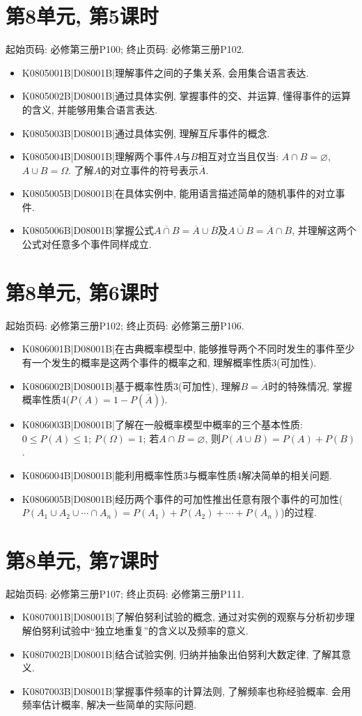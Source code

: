\section*{第8单元, 第5课时}
起始页码: 必修第三册P100; 终止页码: 必修第三册P102.
\begin{itemize}
\item K0805001B|D08001B|理解事件之间的子集关系, 会用集合语言表达.
\item K0805002B|D08001B|通过具体实例, 掌握事件的交、并运算, 懂得事件的运算的含义, 并能够用集合语言表达.
\item K0805003B|D08001B|通过具体实例, 理解互斥事件的概念.
\item K0805004B|D08001B|理解两个事件$A$与$B$相互对立当且仅当: $A\cap B=\varnothing$, $A\cup B=\Omega$. 了解$A$的对立事件的符号表示$\overline A$.
\item K0805005B|D08001B|在具体实例中, 能用语言描述简单的随机事件的对立事件.
\item K0805006B|D08001B|掌握公式$\overline{A\cap B}=\overline A\cup\overline B$及$\overline{A\cup B}=\overline A\cap\overline B$, 并理解这两个公式对任意多个事件同样成立.
\end{itemize}

\section*{第8单元, 第6课时}
起始页码: 必修第三册P102; 终止页码: 必修第三册P106.
\begin{itemize}
\item K0806001B|D08001B|在古典概率模型中, 能够推导两个不同时发生的事件至少有一个发生的概率是这两个事件的概率之和, 理解概率性质3(可加性).
\item K0806002B|D08001B|基于概率性质3(可加性), 理解$B=\overline A$时的特殊情况, 掌握概率性质4($P(A)=1-P(\overline A)$).
\item K0806003B|D08001B|了解在一般概率模型中概率的三个基本性质: $0\le P(A)\le 1$; $P(\Omega)=1$; 若$A\cap B=\varnothing$, 则$P(A\cup B)=P(A)+P(B)$.
\item K0806004B|D08001B|能利用概率性质3与概率性质4解决简单的相关问题.
\item K0806005B|D08001B|经历两个事件的可加性推出任意有限个事件的可加性($P(A_1\cup A_2\cup\cdots\cap A_n)=P(A_1)+P(A_2)+\cdots+P(A_n)$)的过程.
\end{itemize}

\section*{第8单元, 第7课时}
起始页码: 必修第三册P107; 终止页码: 必修第三册P111.
\begin{itemize}
\item K0807001B|D08001B|了解伯努利试验的概念, 通过对实例的观察与分析初步理解伯努利试验中``独立地重复''的含义以及频率的意义.
\item K0807002B|D08001B|结合试验实例, 归纳并抽象出伯努利大数定律, 了解其意义.
\item K0807003B|D08001B|掌握事件频率的计算法则, 了解频率也称经验概率. 会用频率估计概率, 解决一些简单的实际问题.
\end{itemize}

